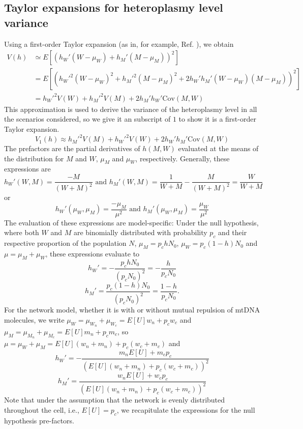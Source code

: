 \documentclass{article}
\begin{document}
\begin{appendices}
\subsection{Taylor expansions for heteroplasmy level variance}\label{app:taylor}
Using a first-order Taylor expansion (as in, for example, Ref. \cite{johnston2015stochastic}), we obtain
\begin{equation*}
    \begin{split}
    V(h) 
 & 
     \simeq  E[(h_W'(W-\mu_W)+h_M'(M-\mu_M))^2]\\
 & = E[(h_W'^2(W-\mu_W)^2+h_M'^2(M-\mu_M)^2
 + 2h_W'h_M'(W-\mu_W)(M-\mu_M))^2]\\
 & = h_W'^2V(W)+h_M'^2V(M)+2h_M'h_W'\mathrm{Cov}(M,W)
   \end{split}
\end{equation*}
This approximation is used to derive the variance of the heteroplasmy level in all the scenarios considered, so we give it an subscript of $1$ to show it is a first-order Taylor expansion.
\begin{equation}\label{eq:app-v1h-general}
    V_1(h)\approx h_M'^2V(M) +
h_W'^2V(W)+2h_W'h_M'\mathrm{Cov}(M,W)
\end{equation}
The prefactors are the partial derivatives of $h(M,W)$ evaluated at the means of the distribution for $M$ and $W$, $\mu_M$ and $\mu_W$, respectively. Generally, these expressions are 
\begin{equation}
h_W'(W,M)=\frac{-M}{(W+M)^2} \text{\ \ and \ \ }
h_M'(W,M)=\frac{1}{W+M}-\frac{M}{(W+M)^2}=\frac{W}{W+M}
\end{equation}
or
\begin{equation}
h_W'(\mu_W,\mu_M)=\frac{-\mu_M}{\mu^2} \text{\ \ and \ \ }
h_M'(\mu_W,\mu_M)=\frac{\mu_W}{\mu^2}
\end{equation}
The evaluation of these expressions are model-specific: Under the null hypothesis, where both $W$ and $M$ are binomially distributed with probability $p_c$ and their respective proportion of the population $N$, $\mu_M=p_chN_0$, $\mu_W=p_c(1-h)N_0$ and $\mu = \mu_M+\mu_W$, these expressions evaluate to
\begin{equation}\label{eq:null-hW.prime}
h_W'=-\frac{p_chN_0}{(p_cN_0)^2}=-\frac{h}{p_cN_0}
\end{equation}
\begin{equation}\label{eq:null-hM.prime}
h_M'=\frac{p_c(1-h)N_0}{(p_cN_0)^2}=\frac{1-h}{p_cN_0}.
\end{equation}
For the network model, whether it is with or without mutual repulsion of mtDNA molecules, we write $\mu_W=\mu_{W_n}+\mu_{W_c}=E[U] w_n +p_cw_c$ and $\mu_M=\mu_{M_n}+\mu_{M_c}=E[U] m_n+p_cm_c$, so $\mu=\mu_W+\mu_M=E[U](w_n+m_n)+p_c(w_c+m_c)$ and
\begin{equation}\label{eq:net-hW.prime}
h_W'=-\frac{m_nE[U]+m_cp_c}{(E[U](w_n+m_n)+p_c(w_c+m_c))^2}
\end{equation}
\begin{equation}\label{eq:net-hM.prime}
h_M' = \frac{w_nE[U]+w_cp_c}{(E[U](w_n+m_n)+p_c(w_c+m_c))^2}
\end{equation}
Note that under the assumption that the network is evenly distributed throughout the cell, i.e., $E[U]=p_c$, we recapitulate the expressions for the null hypothesis pre-factors.

\end{appendices}
\end{document}
